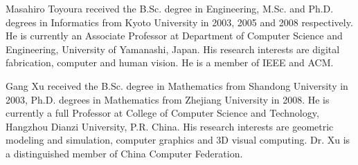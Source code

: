 \documentclass[journal]{IEEEtran}
\begin{document}
\begin{IEEEbiography}{Masahiro Toyoura}
received the B.Sc. degree in Engineering, M.Sc. and Ph.D. degrees in Informatics from Kyoto University in 2003, 2005 and 2008 respectively. 
He is currently an Associate Professor at Department of Computer Science and Engineering, University of Yamanashi, Japan. 
His research interests are digital fabrication, computer and human vision. He is a member of IEEE and ACM.
\end{IEEEbiography}

\begin{IEEEbiography}{Gang Xu}
received the B.Sc. degree in Mathematics from Shandong University in 2003,  Ph.D. degrees in Mathematics from Zhejiang University in 2008. 
He is currently a full Professor at College of Computer Science and Technology, Hangzhou Dianzi University, P.R. China.
His research interests are geometric modeling and simulation, computer graphics and 3D visual computing. Dr. Xu is a distinguished member of China Computer Federation. 
\end{IEEEbiography}
\end{document}
